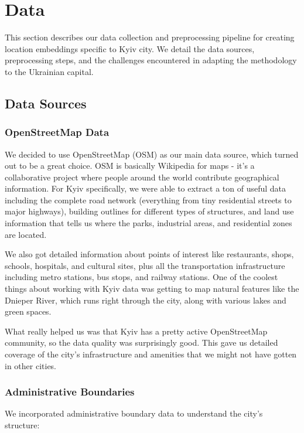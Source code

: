 \section{Data}
\label{sec:data}

This section describes our data collection and preprocessing pipeline for creating location embeddings specific to Kyiv city. We detail the data sources, preprocessing steps, and the challenges encountered in adapting the methodology to the Ukrainian capital.

\subsection{Data Sources}

\subsubsection{OpenStreetMap Data}

We decided to use OpenStreetMap (OSM) as our main data source, which turned out to be a great choice. OSM is basically Wikipedia for maps - it's a collaborative project where people around the world contribute geographical information. For Kyiv specifically, we were able to extract a ton of useful data including the complete road network (everything from tiny residential streets to major highways), building outlines for different types of structures, and land use information that tells us where the parks, industrial areas, and residential zones are located.

We also got detailed information about points of interest like restaurants, shops, schools, hospitals, and cultural sites, plus all the transportation infrastructure including metro stations, bus stops, and railway stations. One of the coolest things about working with Kyiv data was getting to map natural features like the Dnieper River, which runs right through the city, along with various lakes and green spaces.

What really helped us was that Kyiv has a pretty active OpenStreetMap community, so the data quality was surprisingly good. This gave us detailed coverage of the city's infrastructure and amenities that we might not have gotten in other cities.

\subsubsection{Administrative Boundaries}

We incorporated administrative boundary data to understand the city's structure:

